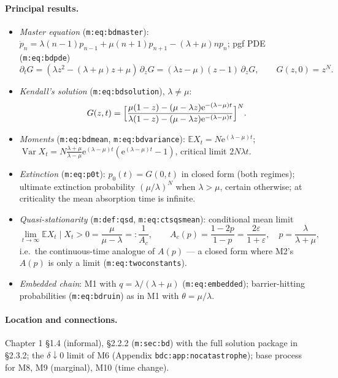 \documentclass[11pt,a4paper]{article}
\newcommand{\EX}{\mathbb{E}}
\newcommand{\Var}{\operatorname{Var}}
\newcommand{\ee}{\mathrm{e}}
\begin{document}
\paragraph{Principal results.}
\begin{itemize}
\item \emph{Master equation} (\texttt{m:eq:bdmaster}):
  $\dot p_n=\lambda(n-1)p_{n-1}+\mu(n+1)p_{n+1}-(\lambda+\mu)np_n$; pgf PDE
  (\texttt{m:eq:bdpde})
  \[
  \partial_tG=(\lambda z^2-(\lambda+\mu)z+\mu)\,\partial_zG
  =(\lambda z-\mu)(z-1)\,\partial_zG,\qquad G(z,0)=z^N.
  \]
\item \emph{Kendall's solution} (\texttt{m:eq:bdsolution}), $\lambda\ne\mu$:
  \[
  G(z,t)=\Bigl[\frac{\mu(1-z)-(\mu-\lambda z)\ee^{-(\lambda-\mu)t}}
  {\lambda(1-z)-(\mu-\lambda z)\ee^{-(\lambda-\mu)t}}\Bigr]^{N}.
  \]
\item \emph{Moments} (\texttt{m:eq:bdmean}, \texttt{m:eq:bdvariance}):
  $\EX{X_t}=N\ee^{(\lambda-\mu)t}$;
  $\Var{X_t}=N\frac{\lambda+\mu}{\lambda-\mu}\ee^{(\lambda-\mu)t}
  (\ee^{(\lambda-\mu)t}-1)$, critical limit $2N\lambda t$.
\item \emph{Extinction} (\texttt{m:eq:p0t}): $p_0(t)=G(0,t)$ in closed form
  (both regimes); ultimate extinction probability $(\mu/\lambda)^N$ when
  $\lambda>\mu$, certain otherwise; at criticality the mean absorption time
  is infinite.
\item \emph{Quasi-stationarity} (\texttt{m:def:qsd},
  \texttt{m:eq:ctsqsmean}): conditional mean limit
  \[
  \lim_{t\to\infty}\EX{X_t\mid X_t>0}=\frac{\mu}{\mu-\lambda}=:\frac{1}{A_c},
  \qquad
  A_c(p)=\frac{1-2p}{1-p}=\frac{2\varepsilon}{1+\varepsilon},
  \quad p=\frac{\lambda}{\lambda+\mu},
  \]
  i.e.\ the continuous-time analogue of $A(p)$ --- a closed form where M2's
  $A(p)$ is only a limit (\texttt{m:eq:twoconstants}).
\item \emph{Embedded chain}: M1 with $q=\lambda/(\lambda+\mu)$
  (\texttt{m:eq:embedded}); barrier-hitting probabilities
  (\texttt{m:eq:bdruin}) as in M1 with $\theta=\mu/\lambda$.
\end{itemize}

\paragraph{Location and connections.} Chapter 1 \S1.4 (informal), \S2.2.2
(\texttt{m:sec:bd}) with the full solution package in \S2.3.2; the
$\delta\downarrow0$ limit of M6 (Appendix \texttt{bdc:app:nocatastrophe});
base process for M8, M9 (marginal), M10 (time change).
\end{document}
